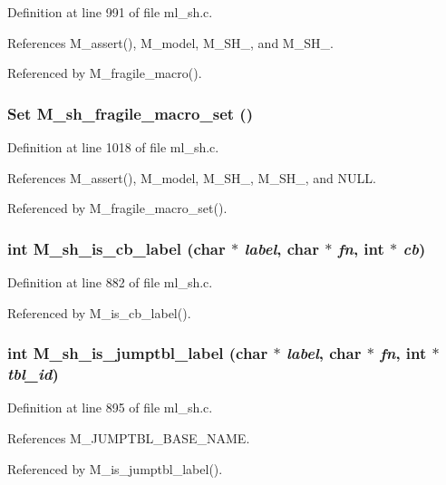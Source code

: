 Definition at line 991 of file ml\_\-sh.c.

References M\_\-assert(), M\_\-model, M\_\-SH\_, and M\_\-SH\_.

Referenced by M\_\-fragile\_\-macro().
\subsubsection{\setlength{\rightskip}{0pt plus 5cm}\bf{Set} M\_\-sh\_\-fragile\_\-macro\_\-set ()}\label{ml__sh_8c_9976636730a2cb3c898f497672b4ae7d}




Definition at line 1018 of file ml\_\-sh.c.

References M\_\-assert(), M\_\-model, M\_\-SH\_, M\_\-SH\_, and NULL.

Referenced by M\_\-fragile\_\-macro\_\-set().
\subsubsection{\setlength{\rightskip}{0pt plus 5cm}int M\_\-sh\_\-is\_\-cb\_\-label (char $\ast$ {\em label}, char $\ast$ {\em fn}, int $\ast$ {\em cb})}\label{ml__sh_8c_65448f776a10b0e627aa2002ba8bcc41}




Definition at line 882 of file ml\_\-sh.c.

Referenced by M\_\-is\_\-cb\_\-label().
\subsubsection{\setlength{\rightskip}{0pt plus 5cm}int M\_\-sh\_\-is\_\-jumptbl\_\-label (char $\ast$ {\em label}, char $\ast$ {\em fn}, int $\ast$ {\em tbl\_\-id})}\label{ml__sh_8c_20c05e67a4f84001f8991217ca1f4093}




Definition at line 895 of file ml\_\-sh.c.

References M\_\-JUMPTBL\_\-BASE\_\-NAME.

Referenced by M\_\-is\_\-jumptbl\_\-label().
